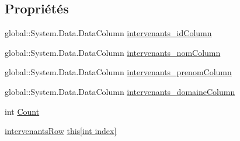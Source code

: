 \subsection*{Propriétés}
\begin{DoxyCompactItemize}
\item 
global\+::\+System.\+Data.\+Data\+Column \hyperlink{classforma_1_1formadb_data_set_1_1intervenants_data_table_a8a087a57ddc1a457496285dca2998706}{intervenants\+\_\+id\+Column}
\item 
global\+::\+System.\+Data.\+Data\+Column \hyperlink{classforma_1_1formadb_data_set_1_1intervenants_data_table_a6c94b1e95092fadde1d8ae53067e033c}{intervenants\+\_\+nom\+Column}
\item 
global\+::\+System.\+Data.\+Data\+Column \hyperlink{classforma_1_1formadb_data_set_1_1intervenants_data_table_af1902cb5af200c91ae0e7ddd42d4162e}{intervenants\+\_\+prenom\+Column}
\item 
global\+::\+System.\+Data.\+Data\+Column \hyperlink{classforma_1_1formadb_data_set_1_1intervenants_data_table_a8b8c009c550db3ca80109468c386bc1b}{intervenants\+\_\+domaine\+Column}
\item 
int \hyperlink{classforma_1_1formadb_data_set_1_1intervenants_data_table_aaf1a1a7570e89c6b79bcd23ff9ff08b3}{Count}
\item 
\hyperlink{classforma_1_1formadb_data_set_1_1intervenants_row}{intervenants\+Row} \hyperlink{classforma_1_1formadb_data_set_1_1intervenants_data_table_a4200399b3a0b27bbcc052a888028aa92}{this\mbox{[}int index\mbox{]}}
\end{DoxyCompactItemize}

